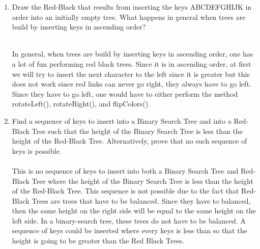 \documentclass{article}
\begin{document}
\begin{enumerate}
\newpage
\item Draw the Red-Black that results from inserting the keys ABCDEFGHIJK in order into an initially empty tree. What happens in general when trees are build by inserting keys in ascending order?

\\
In general, when trees are build by inserting keys in ascending order, one has a lot of fun performing red black trees. Since it is in ascending order, at first we will try to insert the next character to the left since it is greater but this does not work since red links can never go right, they always have to go left. Since they have to go left, one would have to either perform the method rotateLeft(), rotateRight(), and flipColors().


\item Find a sequence of keys to insert into a Binary Search Tree and into a Red-Black Tree such that the height of the Binary Search Tree is less than the height of the Red-Black Tree. Alternatively, prove that no such sequence of keys is possible.
\\
\\
This is no sequence of keys to insert into both a Binary Search Tree and Red-Black Tree where the height of the Binary Search Tree is less than the height of the Red-Black Tree. This sequence is not possible due to the fact that Red-Black Trees are trees that have to be balanced. Since they have to balanced, then the same height on the right side will be equal to the same height on the left side. In a binary-search tree, these trees do not have to be balanced. A sequence of keys could be inserted where every keys is less than so that the height is going to be  greater than the Red Black Trees.




\end{enumerate}
\end{document}
